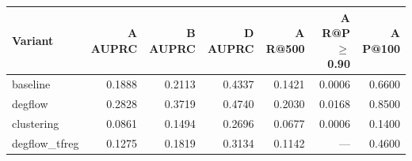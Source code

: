 \begin{tabular}{lrrrrrr}
\toprule
Variant & A AUPRC & B AUPRC & D AUPRC & A R@500 & A R@P$\geq$0.90 & A P@100 \\
\midrule
baseline & 0.1888 & 0.2113 & 0.4337 & 0.1421 & 0.0006 & 0.6600 \\
degflow & 0.2828 & 0.3719 & 0.4740 & 0.2030 & 0.0168 & 0.8500 \\
clustering & 0.0861 & 0.1494 & 0.2696 & 0.0677 & 0.0006 & 0.1400 \\
degflow\_tfreg & 0.1275 & 0.1819 & 0.3134 & 0.1142 & — & 0.4600 \\
\bottomrule
\end{tabular}
